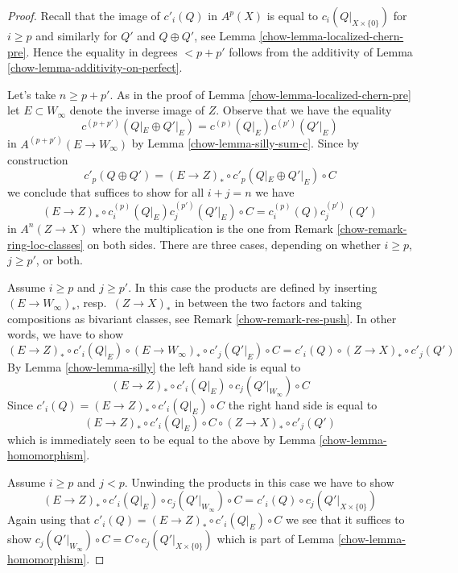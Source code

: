 \begin{proof}

Recall that the image of $c'_i(Q)$ in $A^p(X)$ is equal to
$c_i(Q|_{X \times \{0\}})$ for $i \geq p$ and similarly for
$Q'$ and $Q \oplus Q'$, see Lemma \ref{chow-lemma-localized-chern-pre}.
Hence the equality in degrees $< p + p'$ follows from the
additivity of Lemma \ref{chow-lemma-additivity-on-perfect}.

\medskip\noindent
Let's take $n \geq p + p'$.
As in the proof of Lemma \ref{chow-lemma-localized-chern-pre}
let $E \subset W_\infty$ denote the inverse image of $Z$.
Observe that we have the equality
$$
c^{(p + p')}(Q|_E \oplus Q'|_E) =
c^{(p)}(Q|_E)c^{(p')}(Q'|_E)
$$
in $A^{(p + p')}(E \to W_\infty)$ by Lemma \ref{chow-lemma-silly-sum-c}.
Since by construction
$$
c'_p(Q \oplus Q') = (E \to Z)_* \circ c'_p(Q|_E \oplus Q'|_E) \circ C
$$
we conclude that suffices to show for all $i + j = n$ we have
$$
(E \to Z)_* \circ c^{(p)}_i(Q|_E)c^{(p')}_j(Q'|_E) \circ C
=
c^{(p)}_i(Q)c^{(p')}_j(Q')
$$
in $A^n(Z \to X)$ where the multiplication is the one from
Remark \ref{chow-remark-ring-loc-classes} on both sides. There are
three cases, depending on whether $i \geq p$, $j \geq p'$, or both.

\medskip\noindent
Assume $i \geq p$ and $j \geq p'$. In this case the products are
defined by inserting $(E \to W_\infty)_*$, resp.\ $(Z \to X)_*$ in between
the two factors and taking compositions as bivariant classes, see
Remark \ref{chow-remark-res-push}.
In other words, we have to show
$$
(E \to Z)_* \circ c'_i(Q|_E) \circ
(E \to W_\infty)_* \circ c'_j(Q'|_E) \circ C =
c'_i(Q) \circ (Z \to X)_* \circ c'_j(Q')
$$
By Lemma \ref{chow-lemma-silly} the left hand side is equal to
$$
(E \to Z)_* \circ c'_i(Q|_E) \circ c_j(Q'|_{W_\infty}) \circ C
$$
Since $c'_i(Q) = (E \to Z)_* \circ c'_i(Q|_E) \circ C$
the right hand side is equal to
$$
(E \to Z)_* \circ c'_i(Q|_E) \circ C \circ (Z \to X)_* \circ c'_j(Q')
$$
which is immediately seen to be equal to the above
by Lemma \ref{chow-lemma-homomorphism}.

\medskip\noindent
Assume $i \geq p$ and $j < p$. Unwinding the products
in this case we have to show
$$
(E \to Z)_* \circ c'_i(Q|_E) \circ c_j(Q'|_{W_\infty}) \circ C =
c'_i(Q) \circ c_j(Q'|_{X \times \{0\}})
$$
Again using that $c'_i(Q) = (E \to Z)_* \circ c'_i(Q|_E) \circ C$
we see that it suffices to show $c_j(Q'|_{W_\infty}) \circ C =
C \circ c_j(Q'|_{X \times \{0\}})$ which is part of
Lemma \ref{chow-lemma-homomorphism}.


\end{proof}
